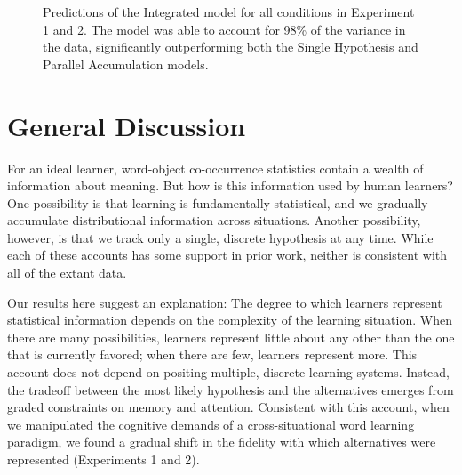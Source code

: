\documentclass[man,floatsintext]{apa6}
\begin{document}
 \begin{figure}[!tb]
	\caption{\label{fig:model_fit} Predictions of the Integrated model for all conditions in Experiment 1 and 2. The model was able to account for 98\% of the variance in the data, significantly outperforming both the Single Hypothesis and Parallel Accumulation models.}
\end{figure}

\section{General Discussion}

For an ideal learner, word-object co-occurrence statistics contain a wealth of information about meaning. But how is this information used by human learners? One possibility is that learning is fundamentally statistical, and we gradually accumulate distributional information across situations. Another possibility, however, is that we track only a single, discrete hypothesis at any time. While each of these accounts has some support in prior work, neither is consistent with all of the extant data.

Our results here suggest an explanation: The degree to which learners represent statistical information depends on the complexity of the learning situation. When there are many possibilities, learners represent little about any other than the one that is currently favored; when there are few, learners represent more. This account does not depend on positing multiple, discrete learning systems. Instead, the tradeoff between the most likely hypothesis and the alternatives emerges from graded constraints on memory and attention. Consistent with this account, when we manipulated the cognitive demands of a cross-situational word learning paradigm, we found a gradual shift in the fidelity with which alternatives were represented (Experiments 1 and 2).
\end{document}
